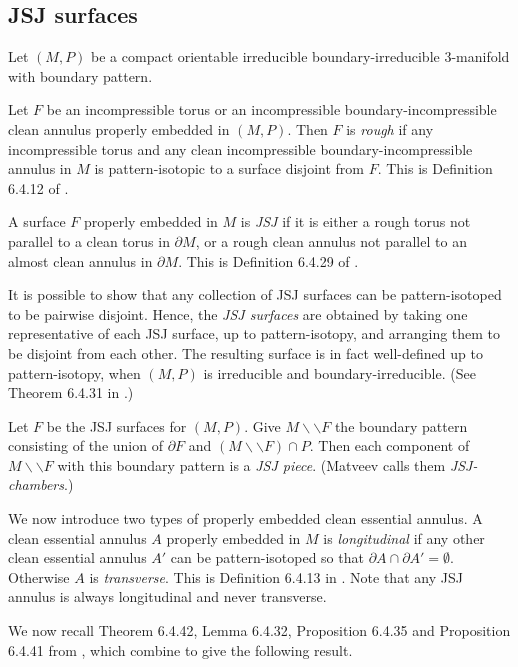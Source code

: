 \documentclass[oneside]{amsart}
\numberwithin{equation}{section}
\theoremstyle{plain}
\theoremstyle{definition}
\newcommand{\cut}{\backslash\backslash}
\begin{document}
\subsection{JSJ surfaces}

Let $(M,P)$ be a compact orientable irreducible boundary-irreducible 3-manifold with boundary pattern. 

Let $F$ be an incompressible torus or an incompressible boundary-incompressible clean annulus properly embedded in $(M, P)$. Then $F$ is \emph{rough} if any incompressible torus and any clean incompressible boundary-incompressible  annulus in $M$ is pattern-isotopic to a surface disjoint from $F$. This is Definition 6.4.12 of \cite{Matveev}.

A surface $F$ properly embedded in $M$ is \emph{JSJ} if it is either a rough torus not parallel to a clean torus in $\partial M$, or a rough clean annulus not parallel to an almost clean annulus in $\partial M$. This is Definition 6.4.29 of \cite{Matveev}. 

It is possible to show that any collection of JSJ surfaces can be pattern-isotoped to be pairwise disjoint. Hence, the \emph{JSJ surfaces} are obtained by taking one representative of each JSJ surface, up to pattern-isotopy, and arranging them to be disjoint from each other. The resulting surface is in fact well-defined up to pattern-isotopy, when $(M,P)$ is irreducible and boundary-irreducible. (See Theorem 6.4.31 in \cite{Matveev}.)

Let $F$ be the JSJ surfaces for $(M,P)$. Give $M \cut F$ the boundary pattern consisting of the union of $\partial F$ and $(M \cut F) \cap P$. Then each component of $M \cut F$ with this boundary pattern is a \emph{JSJ piece}. (Matveev \cite{Matveev} calls them \emph{JSJ-chambers}.)

We now introduce two types of properly embedded clean essential annulus. A clean essential annulus $A$ properly embedded in $M$ is \emph{longitudinal} if any other clean essential annulus $A'$ can be pattern-isotoped so that $\partial A \cap \partial A' = \emptyset$. Otherwise $A$ is \emph{transverse}. This is Definition 6.4.13 in \cite{Matveev}. Note that any JSJ annulus is always longitudinal and never transverse.

We now recall Theorem 6.4.42, Lemma 6.4.32, Proposition 6.4.35 and Proposition 6.4.41 from \cite{Matveev}, which combine to give the following result.
\end{document}
